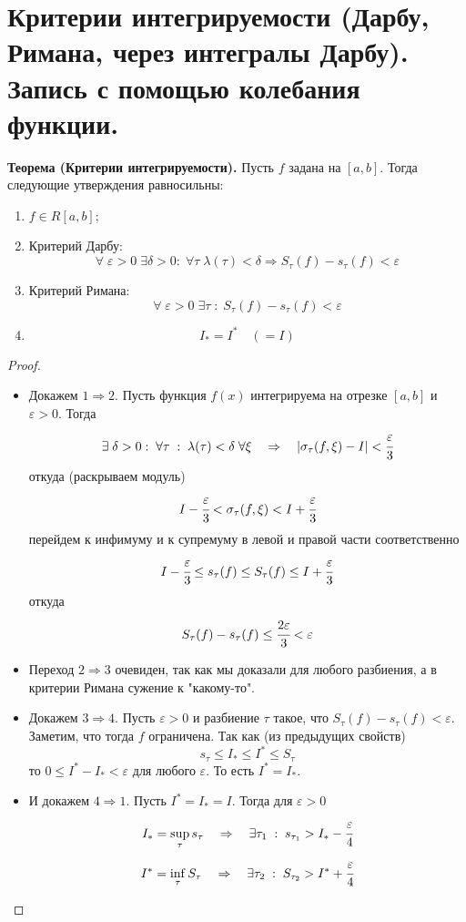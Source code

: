 \documentclass{article}
\newcommand*{\theorem}[2]{\textbf{Теорема #1. } #2 \newline}
\begin{document}
\section{Критерии интегрируемости (Дарбу, Римана, через интегралы Дарбу). Запись с помощью колебания функции.}
\theorem{(Критерии интегрируемости)}{Пусть $f$ задана на $[a, b]$. Тогда следующие утверждения равносильны:}
\begin{enumerate}
    \item $f \in R[a, b]$;
    \item Критерий Дарбу:
    $$
        \forall \; \varepsilon > 0 \; \exists \delta > 0: \; \forall \tau \; \lambda(\tau) < \delta \Rightarrow S_\tau(f) - s_\tau(f) < \varepsilon
    $$
    \item Критерий Римана:
    $$
        \forall \; \varepsilon > 0 \; \exists \tau \; : \; S_\tau(f) - s_\tau(f) < \varepsilon
    $$
    \item 
    $$
        I_* = I^* \quad (= I)
    $$
\end{enumerate}
\begin{proof}
    \begin{itemize}
        \item Докажем $1 \Rightarrow 2$. Пусть функция $f(x)$ интегрируема на отрезке $[a, b]$ и $\varepsilon > 0$. Тогда 
        $$
            \exists \; \delta > 0: \; \forall \tau \; : \; \lambda(\tau) < \delta \; \forall \xi \quad \Rightarrow \quad |\sigma_\tau(f, \xi) - I| < \cfrac{\varepsilon}{3}
        $$
        откуда (раскрываем модуль)
        $$
            I - \cfrac{\varepsilon}{3} < \sigma_\tau(f, \xi) < I + \cfrac{\varepsilon}{3}
        $$
        перейдем к инфимуму и к супремуму в левой и правой части соответственно
        $$
            I - \cfrac{\varepsilon}{3} \leq s_\tau(f) \leq S_\tau(f) \leq I + \cfrac{\varepsilon}{3}
        $$
        откуда 
        $$
            S_\tau(f) - s_\tau(f) \leq \cfrac{2\varepsilon}{3} < \varepsilon    
        $$
        \item Переход $2 \Rightarrow 3$ очевиден, так как мы доказали для любого разбиения, а в критерии Римана сужение к "какому-то".
        \item Докажем $3 \Rightarrow 4$. Пусть $\varepsilon > 0$ и разбиение $\tau$ такое, что $S_\tau(f) - s_\tau(f) < \varepsilon$. Заметим, что тогда $f$ ограничена. Так как (из предыдущих свойств)
        $$
            s_\tau \leq I_* \leq I^* \leq S_\tau
        $$
        то $0 \leq I^* - I_* < \varepsilon$ для любого $\varepsilon$. То есть $I^* = I_*$.
        \item И докажем $4 \Rightarrow 1$. Пусть $I^* = I_* = I$. Тогда для $\varepsilon > 0$
        $$
            I_* = \displaystyle \sup_\tau s_\tau \quad \Rightarrow \quad \exists\tau_1 \; : \; s_{\tau_1} > I_* - \cfrac{\varepsilon}{4}
        $$
        $$
            I^* = \displaystyle \inf_\tau S_\tau \quad \Rightarrow \quad \exists\tau_2 \; : \; S_{\tau_2} > I^* + \cfrac{\varepsilon}{4}
        $$
    \end{itemize}
\end{proof}
\end{document}
